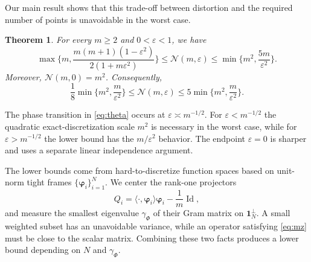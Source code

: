 \documentclass[a4paper]{amsart}
\numberwithin{equation}{section}
\newtheorem{theorem}{Theorem}[section]
\DeclareMathOperator{\Id}{Id}
\begin{document}
Our main result shows that this trade-off between distortion and the required number of points is unavoidable in the worst case.

\begin{theorem}\label{maintheorem}
    For every $m\ge 2$ and $0<\varepsilon<1$, we have
    \begin{equation*}
        \max\Big\{m,\frac{m(m+1)(1-\varepsilon^2)}{2(1+m\varepsilon^2)} \Big\}
        \le \mathcal N(m,\varepsilon)
        \le \min\Big\{m^2,\frac{5m}{\varepsilon^2}\Big\} .
    \end{equation*}
    Moreover, $\mathcal N(m,0)=m^2$.
    Consequently,
    \begin{equation}\label{eq:theta}
        \frac 18 \min\Big\{m^2,\frac{m}{\varepsilon^2}\Big\}
        \le \mathcal N(m,\varepsilon)
        \le 5 \min\Big\{m^2,\frac{m}{\varepsilon^2}\Big\}.
    \end{equation}
\end{theorem}

The phase transition in \eqref{eq:theta} occurs at $\varepsilon\asymp m^{-1/2}$.
For $\varepsilon < m^{-1/2}$ the quadratic exact-discretization scale $m^2$ is necessary in the worst case, while for $\varepsilon > m^{-1/2}$ the lower bound has the $m/\varepsilon^2$ behavior.
The endpoint $\varepsilon=0$ is sharper and uses a separate linear independence argument.

The lower bounds come from hard-to-discretize function spaces based on unit-norm tight frames $\{\bm\varphi_i\}_{i=1}^{N}$.
We center the rank-one projectors
\begin{equation*}
    Q_i = \langle\cdot,\bm\varphi_i\rangle\bm\varphi_i-\frac 1m \Id,
\end{equation*}
and measure the smallest eigenvalue $\gamma_\Phi$ of their Gram matrix on $\bm 1_N^\perp$.
A small weighted subset has an unavoidable variance, while an operator satisfying \eqref{eq:mz} must be close to the scalar matrix.
Combining these two facts produces a lower bound depending on $N$ and $\gamma_\Phi$.
\end{document}
